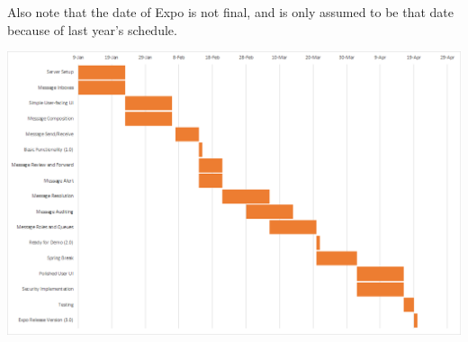 \documentclass[onecolumn, draftclsnofoot,10pt, compsoc]{IEEEtran}
\begin{document}
Also note that the date of Expo is not final, and is only assumed to be that date because of last year's schedule.

\includegraphics{gantt-chart}
\end{document}
